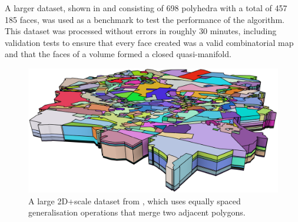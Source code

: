A larger dataset, shown in  and consisting of 698 polyhedra with a total of 457 185 faces, was used as a benchmark to test the performance of the algorithm.
This dataset was processed without errors in roughly 30 minutes, including validation tests to ensure that every face created was a valid combinatorial map and that the faces of a volume formed a closed quasi-manifold.
\begin{figure}[bp]
\includegraphics[width=\linewidth]{figs/atkis}
\caption[A large 2D+scale dataset]{A large 2D+scale dataset from \citet{Meijers11}, which uses equally spaced generalisation operations that merge two adjacent polygons.}
\label{fig:atkis}
\end{figure}


